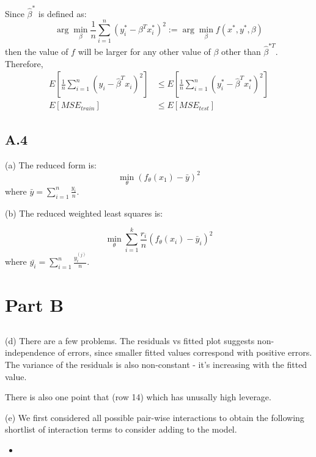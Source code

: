 \documentclass{article}
\begin{document}
    Since $\hat{\beta}^{*}$ is defined as:
    \[\arg\min_{\beta}\frac{1}{n} \sum_{i=1}^n (y^*_i-\beta^Tx^*_i)^2 := \arg\min_{\beta} f(x^*, y^*, \beta)\] 
    then the value of $f$ will be larger for any other value of $\beta$ other than $\hat{\beta}^{*T}$.
    Therefore,
    \[
        \begin{aligned}
            E\left[\frac{1}{n} \sum_{i=1}^n (y_i-\hat{\beta}^Tx_i)^2 \right] &\leq E\left[\frac{1}{n} \sum_{i=1}^n (y^*_i-\hat{\beta}^Tx^*_i)^2 \right]\\
            E[MSE_{train}] &\leq E[MSE_{test}]
        \end{aligned}
    \]

    \subsection{A.4}

    (a) The reduced form is:
    \[\min_\theta (f_\theta(x_1)-\bar{y})^2\]
    where $\bar{y}=\sum_{i=1}^n \frac{y_i}{n}$.

    (b) The reduced weighted least squares is:

    \[\min_\theta \sum_{i=1}^k \frac{r_i}{n} \left( f_\theta(x_i)-\bar{y}_i\right)^2\]
    where $\bar{y_i}=\sum_{i=1}^n \frac{y_i^{(j)}}{n}$.


    \section{Part B}
    \subsection{}
    (d) There are a few problems. The residuals vs fitted plot suggests non-independence of errors,  
    since smaller fitted values correspond with positive errors. 
    The variance of the residuals is also non-constant - it's increasing with the fitted value.

    There is also one point that (row 14) which has unusally high leverage. 

    (e) We first considered all possible pair-wise interactions to obtain the following shortlist of 
    interaction terms to consider adding to the model. 

    \begin{itemize}
        \item  
    \end{itemize}


    \subsection{}
\end{document}
